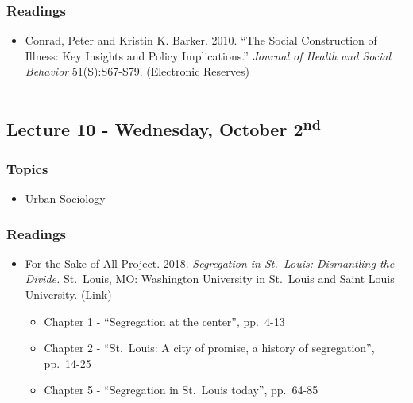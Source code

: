 \documentclass[]{book}
\providecommand{\tightlist}{%
  \setlength{\itemsep}{0pt}\setlength{\parskip}{0pt}}
\begin{document}
\hypertarget{readings-9}{%
\subsubsection*{Readings}\label{readings-9}}

\begin{itemize}
\tightlist
\item
  Conrad, Peter and Kristin K. Barker. 2010. ``The Social Construction of Illness: Key Insights and Policy Implications.'' \emph{Journal of Health and Social Behavior} 51(S):S67-S79. (Electronic Reserves)
\end{itemize}

\begin{center}\rule{0.5\linewidth}{\linethickness}\end{center}

\hypertarget{lecture-10---wednesday-october-2nd}{%
\subsection*{\texorpdfstring{Lecture 10 - Wednesday, October 2\textsuperscript{nd}}{Lecture 10 - Wednesday, October 2nd}}\label{lecture-10---wednesday-october-2nd}}

\hypertarget{topics-11}{%
\subsubsection*{Topics}\label{topics-11}}

\begin{itemize}
\tightlist
\item
  Urban Sociology
\end{itemize}

\hypertarget{readings-10}{%
\subsubsection*{Readings}\label{readings-10}}

\begin{itemize}
\tightlist
\item
  For the Sake of All Project. 2018. \emph{Segregation in St.~Louis: Dismantling the Divide.} St.~Louis, MO: Washington University in St.~Louis and Saint Louis University. (Link)

  \begin{itemize}
  \tightlist
  \item
    Chapter 1 - ``Segregation at the center'', pp.~4-13
  \item
    Chapter 2 - ``St.~Louis: A city of promise, a history of segregation'', pp.~14-25
  \item
    Chapter 5 - ``Segregation in St.~Louis today'', pp.~64-85
  \end{itemize}
\end{itemize}
\end{document}
